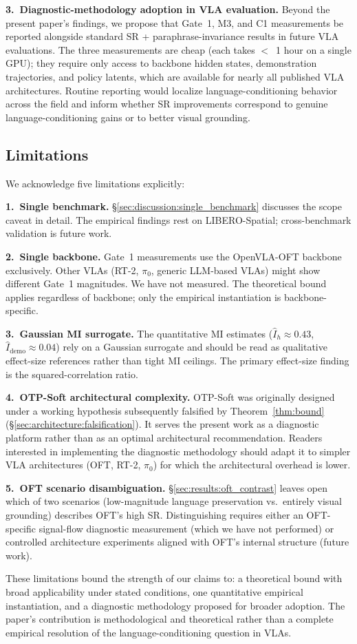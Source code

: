 \textbf{3.~Diagnostic-methodology adoption in VLA evaluation.} Beyond the present paper's
findings, we propose that Gate~1, M3, and C1 measurements be reported alongside standard
SR + paraphrase-invariance results in future VLA evaluations. The three measurements are
cheap (each takes $<$~1 hour on a single GPU); they require only access to backbone
hidden states, demonstration trajectories, and policy latents, which are available for
nearly all published VLA architectures. Routine reporting would localize
language-conditioning behavior across the field and inform whether SR improvements
correspond to genuine language-conditioning gains or to better visual grounding.

\subsection{Limitations}
\label{sec:discussion:limitations}

We acknowledge five limitations explicitly:

\textbf{1.~Single benchmark.} \S\ref{sec:discussion:single_benchmark} discusses the scope
caveat in detail. The empirical findings rest on LIBERO-Spatial; cross-benchmark
validation is future work.

\textbf{2.~Single backbone.} Gate~1 measurements use the OpenVLA-OFT backbone
exclusively. Other VLAs (RT-2, $\pi_0$, generic LLM-based VLAs) might show different
Gate~1 magnitudes. We have not measured. The theoretical bound applies regardless of
backbone; only the empirical instantiation is backbone-specific.

\textbf{3.~Gaussian MI surrogate.} The quantitative MI estimates ($\hat{I}_h \approx
0.43$, $\hat{I}_{\mathrm{demo}} \approx 0.04$) rely on a Gaussian surrogate and should be
read as qualitative effect-size references rather than tight MI ceilings. The primary
effect-size finding is the squared-correlation ratio.

\textbf{4.~OTP-Soft architectural complexity.} OTP-Soft was originally designed under a
working hypothesis subsequently falsified by Theorem~\ref{thm:bound}
(\S\ref{sec:architecture:falsification}). It serves the present work as a diagnostic
platform rather than as an optimal architectural recommendation. Readers interested in
implementing the diagnostic methodology should adapt it to simpler VLA architectures
(OFT, RT-2, $\pi_0$) for which the architectural overhead is lower.

\textbf{5.~OFT scenario disambiguation.} \S\ref{sec:results:oft_contrast} leaves open
which of two scenarios (low-magnitude language preservation vs.\ entirely visual
grounding) describes OFT's high SR. Distinguishing requires either an OFT-specific
signal-flow diagnostic measurement (which we have not performed) or controlled
architecture experiments aligned with OFT's internal structure (future work).

These limitations bound the strength of our claims to: a theoretical bound with broad
applicability under stated conditions, one quantitative empirical instantiation, and a
diagnostic methodology proposed for broader adoption. The paper's contribution is
methodological and theoretical rather than a complete empirical resolution of the
language-conditioning question in VLAs.
